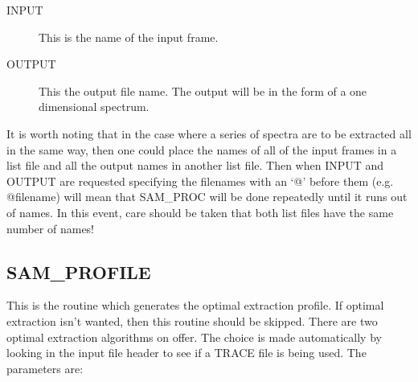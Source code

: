 \begin{description}

\item[INPUT] This is the name of the input frame.

\item[OUTPUT] This the output file name.  The output will be in the form of a
one dimensional spectrum.

\end{description}

It is worth noting that in the case where a series of spectra are to be
extracted all in the same way, then one could place the names of all of the
input frames in a list file and all the output names in another list file. Then
when INPUT and OUTPUT are requested specifying the filenames with an `@' before
them (e.g. @filename) will mean that SAM\_PROC will be done repeatedly until it
runs out of names.  In this event, care should be taken that both list files
have the same number of names!

\subsection{SAM\_PROFILE}

This is the routine which generates the optimal extraction profile.  If optimal
extraction isn't wanted, then this routine should be skipped.  There are two
optimal extraction algorithms on offer.  The choice is made automatically by
looking in the input file header to see if a TRACE file is being used.  The
parameters are:

